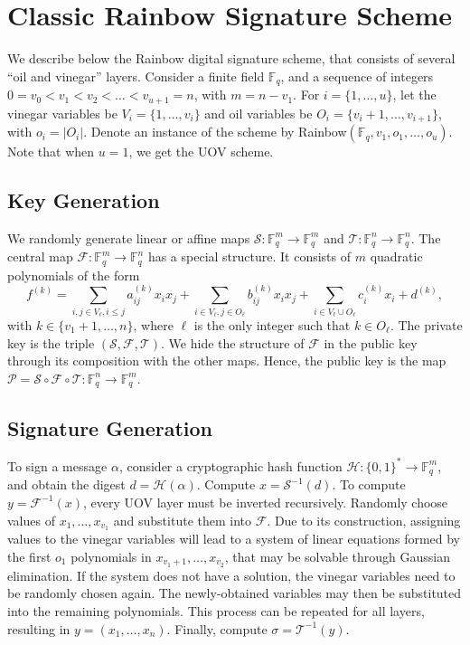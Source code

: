\documentclass[a4paper, 14pt]{extarticle}
\begin{document}
\section{Classic Rainbow Signature Scheme}\label{sec:rainbow}

We describe below the Rainbow digital signature scheme, that consists of several ``oil and vinegar'' layers. Consider a finite field $\mathbb{F}_{q}$, and a sequence of integers $0 = v_{0} < v_{1} < v_{2} < \dots < v_{u+1} = n$, with $m = n - v_{1}$. For $i = \{1, \dots, u\}$, let the vinegar variables be $V_{i} = \{1, \dots, v_{i}\}$ and oil variables be $O_{i} = \{v_{i} + 1, \dots, v_{i+1}\}$, with $o_{i} = |O_{i}|$. Denote an instance of the scheme by Rainbow$(\mathbb{F}_{q}, v_{1}, o_{1}, \dots, o_{u})$. Note that when $u = 1$, we get the UOV scheme. 

\subsection{Key Generation}
We randomly generate linear or affine maps $\mathcal{S}: \mathbb{F}_{q}^{m} \rightarrow \mathbb{F}_{q}^{m}$ and $\mathcal{T}: \mathbb{F}_{q}^{n} \rightarrow \mathbb{F}_{q}^{n}$. The central map $\mathcal{F}: \mathbb{F}_{q}^{m} \rightarrow \mathbb{F}_{q}^{n}$
has a special structure. It consists of $m$ quadratic polynomials of the form
\begin{equation}\label{eq:0}
f^{(k)} = \sum_{i, j \in V_{\ell}, i \leq j} a_{ij}^{(k)} x_{i} x_{j}
        + \sum_{i \in V_{\ell}, j \in O_{\ell}} b_{ij}^{(k)} x_{i} x_{j}
        + \sum_{i \in V_{\ell} \cup O_{\ell}} c_{i}^{(k)} x_{i} + d^{(k)},
\end{equation}
with $k \in \{v_{1} + 1, \dots, n\}$, where $\ell$ is the only integer such that $k \in O_{\ell}$. The private key is the triple $(\mathcal{S}, \mathcal{F}, \mathcal{T})$. We hide the structure of $\mathcal{F}$ in the public key through its composition with the other maps. Hence, the public key is the map $\mathcal{P} = \mathcal{S} \circ \mathcal{F} \circ \mathcal{T} : \mathbb{F}_{q}^{n} \rightarrow \mathbb{F}_{q}^{m}$.

\subsection{Signature Generation} 
To sign a message $\alpha$, consider a cryptographic hash function $\mathcal{H} : \{0, 1\}^{*} \rightarrow \mathbb{F}_{q}^{m}$, and obtain the digest $d = \mathcal{H}(\alpha)$. Compute $x = \mathcal{S}^{-1}(d)$. To compute $y = \mathcal{F}^{-1}(x)$, every UOV layer must be inverted recursively. Randomly choose values of $x_{1}, \dots, x_{v_{1}}$ and substitute them into $\mathcal{F}$. Due to its construction, assigning values to the vinegar variables will lead to a system of linear equations formed by the first $o_{1}$ polynomials in $x_{v_{1} + 1}, \dots, x_{v_{2}}$, that may be solvable through Gaussian elimination. If the system does not have a solution, the vinegar variables need to be randomly chosen again. The newly-obtained variables may then be substituted into the remaining polynomials. This process can be repeated for all layers, resulting in $y = (x_{1}, \dots, x_{n})$. Finally, compute $\sigma = \mathcal{T}^{-1}(y)$.
\end{document}
